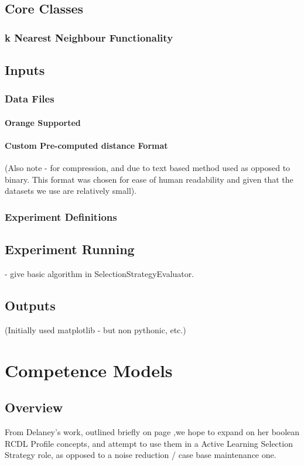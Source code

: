 \documentclass[a4paper,11pt]{report}
\begin{document}
\section{Core Classes}
\subsection{k Nearest Neighbour Functionality}
\section{Inputs}
\subsection{Data Files}
\subsubsection{Orange Supported}

\subsubsection{Custom Pre-computed distance Format}

(Also note - for compression, and due to text based method used as opposed to binary. This format was chosen for ease of human readability and given that the datasets we use are relatively small).

\subsection{Experiment Definitions}

\section{Experiment Running}
- give basic algorithm in SelectionStrategyEvaluator.
\section{Outputs}
(Initially used matplotlib - but non pythonic, etc.)
\chapter{Competence Models\label{cha:CompetenceModels}}
\section{Overview}
From Delaney's work\cite{Delany2009}, outlined briefly on page \pageref{sec:DelaneysWork},we hope to expand on her boolean RCDL Profile concepts, and attempt to use them in a Active Learning Selection Strategy role, as opposed to a noise reduction / case base maintenance one.
\end{document}
